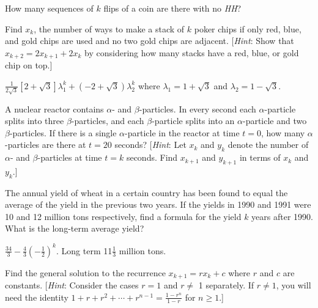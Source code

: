 \begin{multicols}{2}
\begin{ex}
How many sequences of $k$ flips of a coin are there with no \textit{HH}?
\end{ex}

\begin{ex}
Find $x_{k}$, the number of ways to make a stack of $k$ poker chips if only red, blue, and gold chips are used and no two gold chips are adjacent. [\textit{Hint}: Show that $x_{k+2} = 2x_{k+1} + 2x_{k}$ by considering how many stacks have a red, blue, or gold chip on top.]

\begin{sol}
$\frac{1}{2\sqrt{3}} \left[ 2 +\sqrt{3} \right] \lambda_1^k + (-2 + \sqrt{3}) \lambda_2^k$ where $ \lambda_1 = 1 +  \sqrt{3}$ and $ \lambda_2 = 1 -  \sqrt{3}$. 
\end{sol}
\end{ex}

\begin{ex}
A nuclear reactor contains $\alpha$- and $\beta$-particles. In every second each $\alpha$-particle splits into three $\beta$-particles, and each $\beta$-particle splits into an $\alpha$-particle and two $\beta$-particles. If there is a single $\alpha$-particle in the reactor at time $t = 0$, how many $\alpha$-particles are there at $t = 20$ seconds? [\textit{Hint}: Let $x_{k}$ and $y_{k}$ denote the number of $\alpha$- and $\beta$-particles at time $t = k$ seconds. Find $x_{k+1}$ and $y_{k+1}$ in terms of $x_{k}$ and $y_{k}$.]
\end{ex}

\begin{ex}
The
 annual yield of wheat in a certain country has been found to equal the 
average of the yield in the previous two years. If the yields in 1990 
and 1991 were 10 and 12 million tons respectively, find a formula for 
the yield $k$ years after 1990. What is the long-term average yield?

\begin{sol}
$\frac{34}{3} - \frac{4}{3}\left( -\frac{1}{2} \right)^k$. Long term 11$\frac{1}{3}$ million tons.
\end{sol}
\end{ex}

\begin{ex}
Find the general solution to the recurrence $x_{k+1} = rx_{k} + c$ where $r$ and $c$ are constants. [\textit{Hint}: Consider the cases $r = 1$ and $r \neq$ 1 separately. If $r \neq 1$, you will need the identity $ 1 + r + r^2 + \cdots + r^{n-1} = \frac{1 - r^n}{1-r}$  for  $n \geq 1$.]
\end{ex}


\end{multicols}
